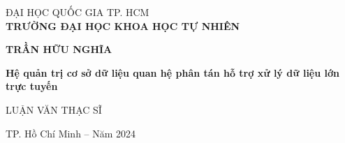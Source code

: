 \documentclass{article}[14pt]
\begin{document}
   
    




    \begin{mdframed}[linewidth=1pt, %
                     linecolor=black, %
                     leftmargin=0, %
                     rightmargin=0, %
                     innertopmargin=20mm, %
                     innerbottommargin=20mm, %
                     innerleftmargin=25mm, %
                     innerrightmargin=25mm, %
                     skipabove=0, %
                     skipbelow=0] %
    \centering
    \vspace*{1cm}
    
    \Large ĐẠI HỌC QUỐC GIA TP. HCM\\
    \vspace{0.25cm}
    \Large \textbf{TRƯỜNG ĐẠI HỌC KHOA HỌC TỰ NHIÊN}\\
    
    \vspace{3cm}
    
    \Large \textbf{TRẦN HỮU NGHĨA}\\
    
    \vspace{3cm}
    
     \textbf{ Hệ quản trị cơ sở dữ liệu quan hệ phân tán
hỗ trợ xử lý dữ liệu lớn trực tuyến}\\
    
    \vspace{3cm}
    
    \Large LUẬN VĂN THẠC SĨ\\
    
    \vfill
    
    TP. Hồ Chí Minh – Năm 2024
    \end{mdframed}
\pagebreak
\end{document}
